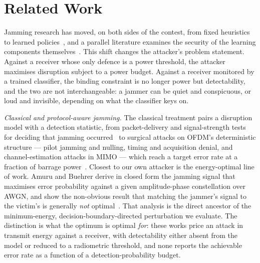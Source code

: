 \section{Related Work}
\label{sec:related}

Jamming research has moved, on both sides of the contest, from fixed heuristics to learned policies~\cite{pirayesh2022jamming,lohan2024survey}, and a parallel literature examines the security of the learning components themselves~\cite{adesina2023adversarial}.
This shift changes the attacker's problem statement.
Against a receiver whose only defence is a power threshold, the attacker maximises disruption subject to a power budget.
Against a receiver monitored by a trained classifier, the binding constraint is no longer power but detectability, and the two are not interchangeable: a jammer can be quiet and conspicuous, or loud and invisible, depending on what the classifier keys on.

\textit{Classical and protocol-aware jamming.}
The classical treatment pairs a disruption model with a detection statistic, from packet-delivery and signal-strength tests for deciding that jamming occurred~\cite{xu2005feasibility} to surgical attacks on OFDM's deterministic structure --- pilot jamming and nulling, timing and acquisition denial, and channel-estimation attacks in MIMO --- which reach a target error rate at a fraction of barrage power~\cite{shahriar2015phy,clancy2011efficient,lapan2012jamming,zhang2019jam}.
Closest to our own attacker is the energy-optimal line of work.
Amuru and Buehrer derive in closed form the jamming signal that maximises error probability against a given amplitude-phase constellation over AWGN, and show the non-obvious result that matching the jammer's signal to the victim's is generally \emph{not} optimal~\cite{amuru2015optimal}.
That analysis is the direct ancestor of the minimum-energy, decision-boundary-directed perturbation we evaluate.
The distinction is what the optimum is optimal \emph{for}: these works price an attack in transmit energy against a receiver, with detectability either absent from the model or reduced to a radiometric threshold, and none reports the achievable error rate as a function of a detection-probability budget.


